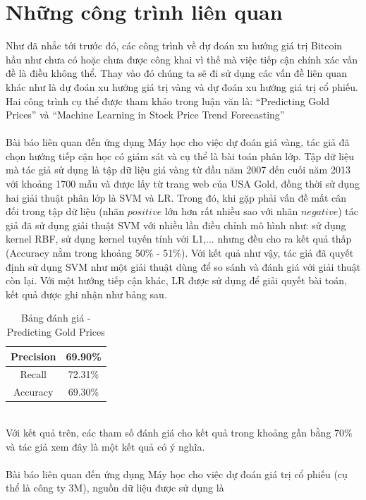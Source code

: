 \chapter{Những công trình liên quan}
Như đã nhắc tới trước đó, các công trình về dự đoán xu hướng giá trị Bitcoin 
hầu như chưa có hoặc chưa được công khai vì thế mà việc tiếp cận chính xác vấn 
đề là điều không thể. Thay vào đó chúng ta sẽ đi sử dụng các vấn đề liên quan 
khác như là dự đoán xu hướng giá trị vàng và dự đoán xu hướng giá trị cổ phiếu.
Hai công trình cụ thể được tham khảo trong luận văn là: 
``Predicting Gold Prices'' \cite{PredictingGoldPrices} và 
``Machine Learning in Stock Price Trend Forecasting'' 
\cite{StockPriceTrendForecasting} \\\\ 
Bài báo \cite{PredictingGoldPrices} liên quan đến ứng dụng Máy học cho việc dự đoán 
giá vàng, tác giả đã chọn hướng tiếp cận học có giám sát và cụ thể là bài toán 
phân lớp. Tập dữ liệu mà tác giả sử dụng là tập dữ liệu giá vàng từ đầu năm 2007 
đến cuối năm 2013 với khoảng 1700 mẫu và được lấy từ trang web của USA Gold, 
đồng thời sử dụng hai giải thuật phân lớp là SVM và LR.
Trong đó, khi gặp phải vấn đề mất cân đối trong tập dữ liệu (nhãn $positive$ 
lớn hơn rất nhiều sao với nhãn $negative$) tác giả đã sử dụng giải thuật SVM 
với nhiều lần điều chỉnh mô hình như: sử dụng kernel RBF, sử dụng kernel tuyến 
tính với L1,... nhưng đều cho ra kết quả thấp (Accuracy nằm trong khoảng 50\% 
- 51\%). Với kết quả như vậy, tác giả đã quyết định sử dụng SVM như một giải 
thuật dùng để so sánh và đánh giá với giải thuật còn lại. Với một hướng tiếp 
cận khác, LR được sử dụng để giải quyết bài toán, kết quả được ghi nhận như 
bảng sau.
\begin{table}[h]
\centering
\begin{tabular}{ |c|c| }
\hline
Precision & 69.90\% \\
\hline
Recall & 72.31\% \\
\hline
Accuracy & 69.30\% \\
\hline
\end{tabular}
\caption{Bảng đánh giá - Predicting Gold Prices}
\end{table}\\
Với kết quả trên, các tham số đánh giá cho kết quả trong khoảng gần bằng 70\% 
và tác giả xem đây là một kết quả có ý nghĩa.\\\\
Bài báo \cite{StockPriceTrendForecasting} liên quan đến ứng dụng Máy học cho việc 
dự đoán giá trị cổ phiếu (cụ thể là công ty 3M), nguồn dữ liệu được sử dụng là 
